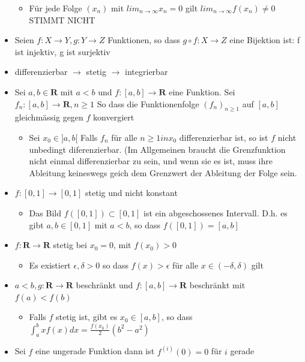 \documentclass[8pt]{extarticle}
\begin{document}
\begin{multicols*}{3}
\begin{itemize}
\begin{itemize}
 \item Für jede Folge $(x_n)$ mit $lim_ {n \to \infty} x_n = 0$ gilt $lim_{n \to \infty} f(x_n) \neq 0$ STIMMT NICHT
\end{itemize}
 \item Seien $f : X  \rightarrow Y, g: Y \rightarrow Z$ Funktionen, so dass $g \circ f: X \rightarrow Z$ eine Bijektion ist: f ist injektiv, g ist surjektiv
 \item differenzierbar $\rightarrow$ stetig $\rightarrow$ integrierbar
 \item Sei $a, b \in \mathbf{R}$ mit $a < b$ und $f: [a, b] \rightarrow \mathbf{R}$ eine Funktion. Sei $f_n: [a, b] \rightarrow \mathbf{R}, n \geq 1$ So dass die Funktionenfolge $(f_n)_{n \geq 1}$ auf $[a, b]$ gleichmässig gegen $f$ konvergiert
\begin{itemize}
 \item Sei $x_0 \in ]a, b[$ Falls $f_n$ für alle $n \geq 1 in x_0$ differenzierbar ist, so ist $f$ nicht unbedingt diferenzierbar. (Im Allgemeinen braucht die Grenzfunktion nicht einmal differenzierbar zu sein, und wenn sie es ist, muss ihre Ableitung keineswegs geich dem Grenzwert der Ableitung der Folge sein.
\end{itemize}
 \item $f: [0, 1] \rightarrow [0, 1]$ stetig und nicht konstant
\begin{itemize}
 \item Das Bild $f([0, 1]) \subset [0, 1]$ ist ein abgeschossenes Intervall. D.h. es gibt $a, b  \in [0, 1]$ mit $a < b$, so dass $f([0, 1]) = [a, b]$
\end{itemize}
 \item $f: \mathbf{R} \rightarrow \mathbf{R}$ stetig bei $x_0 = 0$, mit $f(x_0) > 0$
\begin{itemize}
 \item Es existiert $\epsilon , \delta > 0$ so dass $f(x) > \epsilon$ für alle $x \in (-\delta, \delta)$ gilt
\end{itemize}
 \item $a < b, g: \mathbf{R} \rightarrow \mathbf{R}$ beschränkt und $f: [a, b] \rightarrow \mathbf{R}$ beschränkt mit $f(a) < f(b)$
\begin{itemize}
  \item Falls $f$ stetig ist, gibt es $x_0 \in [a, b]$, so dass $\int_{a}^{b}xf(x)dx = \frac{f(x_0)}{2} (b^2 -a^2)$
\end{itemize}
 \item Sei $f$ eine ungerade Funktion dann ist $f^{(i)} (0) = 0$ für $i$ gerade

\end{itemize}
\end{multicols*}
\end{document}
